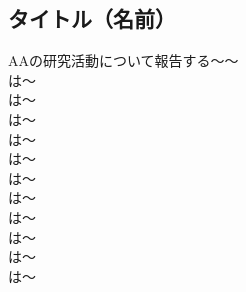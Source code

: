\subsection{タイトル（名前）}

AAの研究活動について報告する〜〜\\
\cite{AA01}は〜\\
\cite{AA11}は〜\\
\cite{AA02}は〜\\
\cite{AA03}は〜\\
\cite{AA04}は〜\\
\cite{AA05}は〜\\
\cite{AA06}は〜\\
\cite{AA07}は〜\\
\cite{AA08}は〜\\
\cite{AA09}は〜\\
\cite{AA10}は〜\\

